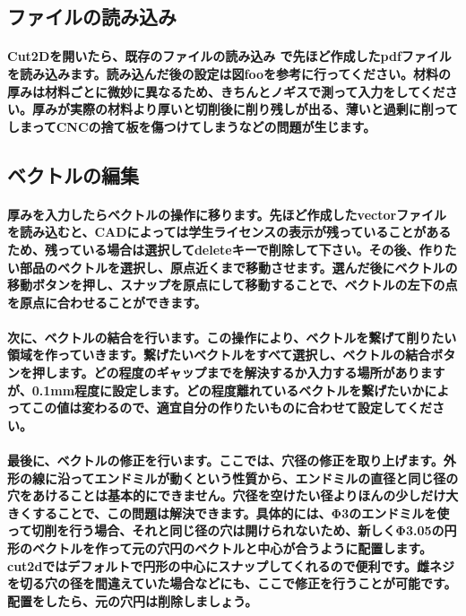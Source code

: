 \documentclass[b5paper, 9pt, twocolumn, titlepage,openany]{jsbook}%
\begin{document}
\subsection{ファイルの読み込み}
\paragraph{Cut2Dを開いたら、既存のファイルの読み込み で先ほど作成したpdfファイルを読み込みます。読み込んだ後の設定は図fooを参考に行ってください。材料の厚みは材料ごとに微妙に異なるため、きちんとノギスで測って入力をしてください。厚みが実際の材料より厚いと切削後に削り残しが出る、薄いと過剰に削ってしまってCNCの捨て板を傷つけてしまうなどの問題が生じます。}

\subsection{ベクトルの編集}
\paragraph{厚みを入力したらベクトルの操作に移ります。先ほど作成したvectorファイルを読み込むと、CADによっては学生ライセンスの表示が残っていることがあるため、残っている場合は選択してdeleteキーで削除して下さい。その後、作りたい部品のベクトルを選択し、原点近くまで移動させます。選んだ後にベクトルの移動ボタンを押し、スナップを原点にして移動することで、ベクトルの左下の点を原点に合わせることができます。}
\paragraph{次に、ベクトルの結合を行います。この操作により、ベクトルを繋げて削りたい領域を作っていきます。繋げたいベクトルをすべて選択し、ベクトルの結合ボタンを押します。どの程度のギャップまでを解決するか入力する場所がありますが、0.1mm程度に設定します。どの程度離れているベクトルを繋げたいかによってこの値は変わるので、適宜自分の作りたいものに合わせて設定してください。}
\paragraph{最後に、ベクトルの修正を行います。ここでは、穴径の修正を取り上げます。外形の線に沿ってエンドミルが動くという性質から、エンドミルの直径と同じ径の穴をあけることは基本的にできません。穴径を空けたい径よりほんの少しだけ大きくすることで、この問題は解決できます。具体的には、Φ3のエンドミルを使って切削を行う場合、それと同じ径の穴は開けられないため、新しくΦ3.05の円形のベクトルを作って元の穴円のベクトルと中心が合うように配置します。cut2dではデフォルトで円形の中心にスナップしてくれるので便利です。雌ネジを切る穴の径を間違えていた場合などにも、ここで修正を行うことが可能です。配置をしたら、元の穴円は削除しましょう。}
\end{document}

